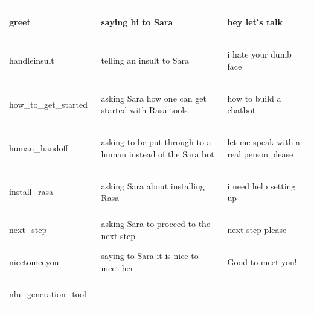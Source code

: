 \documentclass[bsc,frontabs,twoside,singlespacing,parskip,deptreport]{infthesis}
\begin{document}
{\begin{center}
\begin{longtable}{p{}|p{}|p{}}
    \hline
    \begin{spverbatim}greet\end{spverbatim} & saying hi to Sara & \begin{spverbatim}hey let's talk\end{spverbatim} \\
    \hline
    \begin{spverbatim}handleinsult\end{spverbatim} & telling an insult to Sara & \begin{spverbatim}i hate your dumb face\end{spverbatim} \\
    \hline
    \begin{spverbatim}how_to_get_started\end{spverbatim} & asking Sara how one can get started with Rasa tools & \begin{spverbatim}how to build a chatbot\end{spverbatim} \\
    \hline
    \begin{spverbatim}human_handoff\end{spverbatim} & asking to be put through to a human instead of the Sara bot & \begin{spverbatim}let me speak with a real person please\end{spverbatim} \\
    \hline
    \begin{spverbatim}install_rasa\end{spverbatim} & asking Sara about installing Rasa & \begin{spverbatim}i need help setting up\end{spverbatim} \\
    \hline
    \begin{spverbatim}next_step\end{spverbatim} & asking Sara to proceed to the next step & \begin{spverbatim}next step please\end{spverbatim} \\
    \hline
    \begin{spverbatim}nicetomeeyou\end{spverbatim} & saying to Sara it is nice to meet her & \begin{spverbatim}Good to meet you!\end{spverbatim} \\
    \hline
    \begin{spverbatim}nlu_generation_tool_

\end{spverbatim}
\end{longtable}
\end{center}}
\end{document}
